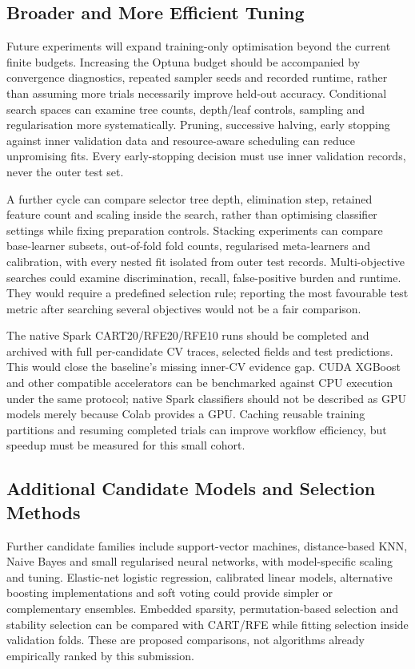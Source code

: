 \subsection{Broader and More Efficient Tuning}
Future experiments will expand training-only optimisation beyond the current finite budgets. Increasing the Optuna budget should be accompanied by convergence diagnostics, repeated sampler seeds and recorded runtime, rather than assuming more trials necessarily improve held-out accuracy. Conditional search spaces can examine tree counts, depth/leaf controls, sampling and regularisation more systematically. Pruning, successive halving, early stopping against inner validation data and resource-aware scheduling can reduce unpromising fits. Every early-stopping decision must use inner validation records, never the outer test set.

A further cycle can compare selector tree depth, elimination step, retained feature count and scaling inside the search, rather than optimising classifier settings while fixing preparation controls. Stacking experiments can compare base-learner subsets, out-of-fold fold counts, regularised meta-learners and calibration, with every nested fit isolated from outer test records. Multi-objective searches could examine discrimination, recall, false-positive burden and runtime. They would require a predefined selection rule; reporting the most favourable test metric after searching several objectives would not be a fair comparison.

The native Spark CART20/RFE20/RFE10 runs should be completed and archived with full per-candidate CV traces, selected fields and test predictions. This would close the baseline's missing inner-CV evidence gap. CUDA XGBoost and other compatible accelerators can be benchmarked against CPU execution under the same protocol; native Spark classifiers should not be described as GPU models merely because Colab provides a GPU. Caching reusable training partitions and resuming completed trials can improve workflow efficiency, but speedup must be measured for this small cohort.

\subsection{Additional Candidate Models and Selection Methods}
Further candidate families include support-vector machines, distance-based KNN, Naive Bayes and small regularised neural networks, with model-specific scaling and tuning. Elastic-net logistic regression, calibrated linear models, alternative boosting implementations and soft voting could provide simpler or complementary ensembles. Embedded sparsity, permutation-based selection and stability selection can be compared with CART/RFE while fitting selection inside validation folds. These are proposed comparisons, not algorithms already empirically ranked by this submission.

